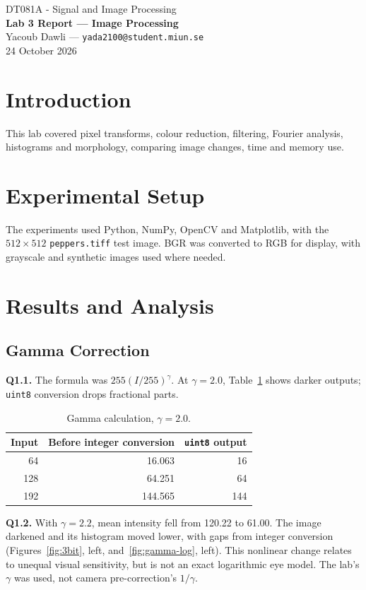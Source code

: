 \documentclass[10pt,a4paper]{article}
\begin{document}
\begin{center}
{\large DT081A - Signal and Image Processing}\\[2pt]
{\large\bfseries Lab 3 Report --- Image Processing}\\[3pt]
Yacoub Dawli --- \texttt{yada2100@student.miun.se}\\[2pt]
{\small 24 October 2026}
\end{center}
\vspace{-5pt}

\section{Introduction}
This lab covered pixel transforms, colour reduction, filtering, Fourier analysis,
histograms and morphology, comparing image changes, time and memory use.

\section{Experimental Setup}
The experiments used Python, NumPy, OpenCV and Matplotlib, with the \(512\times512\) \texttt{peppers.tiff} test image. BGR was converted to RGB for display, with grayscale and synthetic images used where needed.

\section{Results and Analysis}
\subsection{Gamma Correction}
\textbf{Q1.1.} The formula was \(255(I/255)^\gamma\). At \(\gamma=2.0\),
Table~\ref{tab:gamma} shows darker outputs; \texttt{uint8} conversion drops
fractional parts.

\begin{table}[H]
\centering
\caption{Gamma calculation, \(\gamma=2.0\).}\label{tab:gamma}
\begin{tabular}{rrr}\toprule
Input & Before integer conversion & \texttt{uint8} output\\\midrule
64 & 16.063 & 16\\
128 & 64.251 & 64\\
192 & 144.565 & 144\\\bottomrule
\end{tabular}
\end{table}

\textbf{Q1.2.} With \(\gamma=2.2\), mean intensity fell from 120.22 to 61.00.
The image darkened and its histogram moved lower, with gaps from integer
conversion (Figures~\ref{fig:3bit}, left, and~\ref{fig:gamma-log}, left). This nonlinear change relates to unequal
visual sensitivity, but is not an exact logarithmic eye model. The lab's \(\gamma\) was used, not camera pre-correction's \(1/\gamma\).
\end{document}
